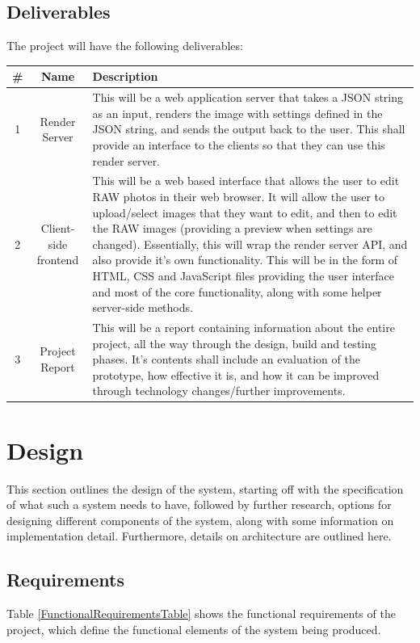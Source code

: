 \documentclass[12pt,a4paper]{article}
\begin{document}
\subsection{Deliverables}
The project will have the following deliverables:
\begin{table}
  \begin{tabular}{| c | c | p{12cm} |}
    \hline
    \textbf{\#} & \textbf{Name} & \textbf{Description}\\
    \hline
    1 & Render Server & This will be a web application server that takes a JSON string as an input,
    renders the image with settings defined in the JSON string, and sends the output back
    to the user. This shall provide an interface to the clients so that they can use this
    render server. \\
    \hline
    2 & Client-side frontend & This will be a web based interface that allows the user to
    edit RAW photos in their web browser. It will allow the user to upload/select images that they
    want to edit, and then to edit the RAW images (providing a preview when settings are changed). Essentially,
    this will wrap the render server API, and also provide it's own functionality. This will
    be in the form of HTML, CSS and JavaScript files providing the user interface and most of the core
    functionality, along with some helper server-side methods. \\
    \hline
    3 & Project Report & This will be a report containing information about the entire project,
    all the way through the design, build and testing phases. It's contents shall include an evaluation of
    the prototype, how effective it is, and how it can be improved through technology changes/further improvements.\\
    \hline
  \end{tabular}
\end{table}

\section{Design}

This section outlines the design of the system, starting off with the specification of what such a system
needs to have, followed by further research, options for designing different components of the system,
along with some information on implementation detail. Furthermore, details on architecture are outlined here.

\subsection{Requirements}
Table \ref{FunctionalRequirementsTable} shows the functional requirements of the project,
which define the functional elements of the system being produced.
\end{document}
